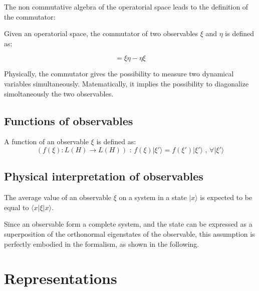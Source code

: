 \documentclass{article}
\begin{document}
The non commutative algebra of the operatorial space leads to the definition of the commutator:

\begin{tcolorbox}[colframe=gray!90, colback=blue!5, coltitle=white, sharp corners, title=\textbf{Definition: Commutator}, fonttitle=\large\bfseries]
  Given an operatorial space, the commutator of two observables $\xi$ and $\eta$ is defined as:

  \begin{equation}
    [\xi,\eta]=\xi\eta-\eta\xi
  \end{equation}
\end{tcolorbox}


Physically, the commutator gives the possibility to measure two dynamical variables simultaneously.
Matematically, it implies the possibility to diagonalize simoltaneously the two observables.

\subsection{Functions of observables}

\begin{tcolorbox}[colframe=gray!90, colback=blue!5, coltitle=white, title= \textbf{Definition}: Function of Observables, fonttitle=\large]
  A function of an observable $\xi$ is defined as:
  \begin{equation}
    \text{$(f(\xi): L(H) \rightarrow L(H))$ : $f(\xi)|\xi'\rangle = f(\xi')|\xi'\rangle $ , $\forall |\xi'\rangle $}
  \end{equation}
\end{tcolorbox}

\subsection{Physical interpretation of observables}

The average value of an observable $\xi$ on a system in a state $|x\rangle $ is expected to be equal to $\langle x|\xi|x\rangle $.

Since an observable form a complete system, and the state can be expressed as a superposition of the orthonormal eigenstates of the observable,
this assumption is perfectly embodied in the formalism, as shown in the following.


\section{Representations}
\end{document}
